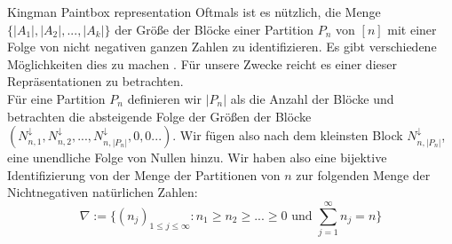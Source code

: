 \begin{section}{Kingman Paintbox representation}
Oftmals ist es nützlich, die Menge $\{|A_1|,|A_2|,...,|A_k|\}$ der Größe der Blöcke einer Partition $P_n$ von $[n]$ mit einer Folge von nicht negativen ganzen Zahlen zu identifizieren. Es gibt verschiedene Möglichkeiten dies zu machen \cite[Seite 15]{pitman2006combinatorial}. Für unsere Zwecke reicht es einer dieser Repräsentationen zu betrachten.
\\
Für eine Partition $P_n$ definieren wir $|P_n|$ als die Anzahl der Blöcke und betrachten die absteigende Folge der Größen der Blöcke $(N^\downarrow_{n,1},N^\downarrow_{n,2},...,N^\downarrow_{n,|P_n|},0,0...)$. Wir fügen also nach dem kleinsten Block $N^\downarrow_{n,|P_n|}$, eine unendliche Folge von Nullen hinzu. Wir haben also eine bijektive Identifizierung von der Menge der Partitionen von $n$ zur folgenden Menge der Nichtnegativen natürlichen Zahlen:
\[
\nabla := \{(n_j)_{1\leq j \leq \infty}: n_1 \geq n_2 \geq ... \geq 0 \text{ und } \sum_{j=1}^{\infty}{n_j} = n\}
\] 


\end{section}
